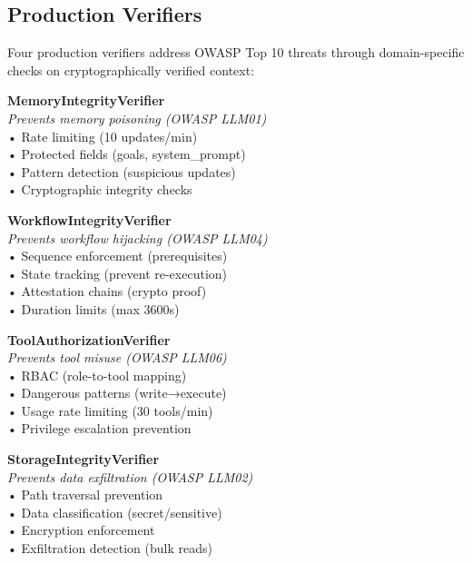 \subsection*{Production Verifiers}

Four production verifiers address OWASP Top 10 threats through domain-specific checks on cryptographically verified context:

{\tiny
\noindent\begin{minipage}[t]{0.48\columnwidth}
\textbf{MemoryIntegrityVerifier}\\
\textit{Prevents memory poisoning (OWASP LLM01)}\\
• Rate limiting (10 updates/min)\\
• Protected fields (goals, system\_prompt)\\
• Pattern detection (suspicious updates)\\
• Cryptographic integrity checks
\end{minipage}
\hfill
\begin{minipage}[t]{0.48\columnwidth}
\textbf{WorkflowIntegrityVerifier}\\
\textit{Prevents workflow hijacking (OWASP LLM04)}\\
• Sequence enforcement (prerequisites)\\
• State tracking (prevent re-execution)\\
• Attestation chains (crypto proof)\\
• Duration limits (max 3600s)
\end{minipage}

\vspace{0.5em}

\noindent\begin{minipage}[t]{0.48\columnwidth}
\textbf{ToolAuthorizationVerifier}\\
\textit{Prevents tool misuse (OWASP LLM06)}\\
• RBAC (role-to-tool mapping)\\
• Dangerous patterns (write→execute)\\
• Usage rate limiting (30 tools/min)\\
• Privilege escalation prevention
\end{minipage}
\hfill
\begin{minipage}[t]{0.48\columnwidth}
\textbf{StorageIntegrityVerifier}\\
\textit{Prevents data exfiltration (OWASP LLM02)}\\
• Path traversal prevention\\
• Data classification (secret/sensitive)\\
• Encryption enforcement\\
• Exfiltration detection (bulk reads)
\end{minipage}
}
